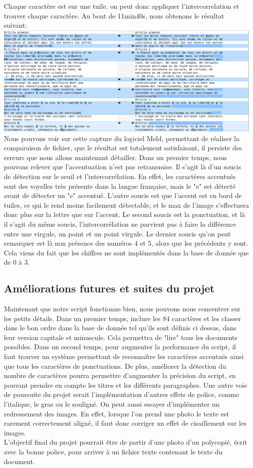 \documentclass[a4paper,12pt,titlepage]{report}
\begin{document}
	Chaque caractère est sur une tuile, on peut donc appliquer l'intercorrelation et trouver chaque caractère.
	Au bout de 11min40s, nous obtenons le résultat suivant:
	\includegraphics[scale=0.25]{../illus/diffDUDH.png}
	Nous pouvons voir sur cette capture du logiciel Meld, permettant de réaliser la comparaison de fichier, que le résultat est totalement satisfaisant, il persiste des erreurs que nous allons maintenant détailler.
	Dans un premier temps, nous pouvons relever que l'accentuation n'est pas retransmise. Il s'agit là d'un soucis de détection sur le seuil et l'intercorrélation. En effet, les caractères accentués sont des voyelles très présente dans la langue française, mais le "e" est détecté avant de détecter un "e" accentué. L'autre soucis est que l'accent est en bord de tuiles, ce qui le rend moins facilement détectable, et le max de l'image s'effectuera donc plus sur la lettre que sur l'accent.
	Le second soucis est la ponctuation, et là il s'agit du même soucis, l'intercorrélation ne parvient pas à faire la différence entre une virgule, un point et un point virgule.
	Le dernier soucis qu'on peut remarquer est là non présence des numéros 4 et 5, alors que les précédents y sont. Cela viens du fait que les chiffres ne sont implémentés dans la base de donnée que de 0 à 3.
	\subsection{Améliorations futures et suites du projet}	
	Maintenant que notre script fonctionne bien, nous pouvons nous concentrer sur les petits détails. Dans un premier temps, inclure les 84 caractères et les classer dans le bon ordre dans la base de donnée tel qu'ils sont définis ci dessus, dans leur version capitale et minuscule. Cela permettra de "lire" tous les documents possibles. Dans un second temps, pour augmenter la performance du script, il faut trouver un système permettant de reconnaître les caractères accentués ainsi que tous les caractères de ponctuations. De plus, améliorer la détection du nombre de caractères pourra permettre d'augmenter la précision du script, en pouvant prendre en compte les titres et les différents paragraphes.
	Une autre voie de poursuite du projet serait l'implémentation d'autres effets de police, comme l'italique, le gras ou le souligné.
	On peut aussi essayer d'implémenter un redressement des images. En effet, lorsque l'on prend une photo le texte est rarement correctement aligné, il faut donc corriger un effet de cisaillement sur les images.\\
	L'objectif final du projet pourrait être de partir d'une photo d'un polycopié, écrit avec la bonne police, pour arriver à un fichier texte contenant le texte du document.
\end{document}
